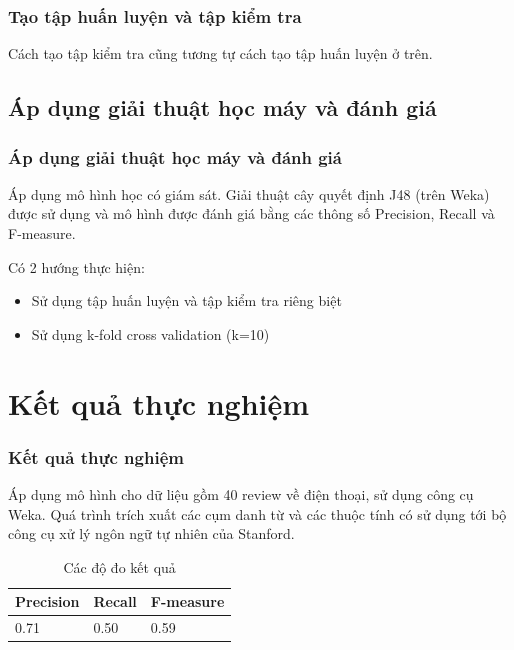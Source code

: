 \documentclass{beamer}
\begin{document}
\begin{frame}
\frametitle{Tạo tập huấn luyện và tập kiểm tra}
\begin{block}{}
Cách tạo tập kiểm tra cũng tương tự cách tạo tập huấn luyện ở trên.
\end{block}
\end{frame}

\subsection{Áp dụng giải thuật học máy và đánh giá}
\begin{frame}
\frametitle{Áp dụng giải thuật học máy và đánh giá}
\begin{block}{}
Áp dụng mô hình học có giám sát. Giải thuật cây quyết định J48 (trên Weka) được sử dụng và mô hình được đánh giá bằng các thông số Precision, Recall và F-measure.
\end{block}
\begin{block}{}
Có 2 hướng thực hiện:
\begin{itemize}
\item Sử dụng tập huấn luyện và tập kiểm tra riêng biệt
\item Sử dụng k-fold cross validation (k=10)
\end{itemize}
\end{block}
\end{frame}

\section{Kết quả thực nghiệm}
\begin{frame}
\frametitle{Kết quả thực nghiệm}
\begin{block}{}
Áp dụng mô hình cho dữ liệu gồm 40 review về điện thoại, sử dụng công cụ Weka. Quá trình trích xuất các cụm danh từ và các thuộc tính có sử dụng tới bộ công cụ xử lý ngôn ngữ tự nhiên của Stanford.
\end{block}
\begin{table}[]
\centering
\caption{Các độ đo kết quả}
\label{my-label}
\begin{tabular}{|l|l|l|}
\hline
\textbf{Precision} & \textbf{Recall} & \textbf{F-measure} \\ \hline
0.71               & 0.50            & 0.59               \\ \hline
\end{tabular}
\end{table}
\end{frame}
\end{document}
